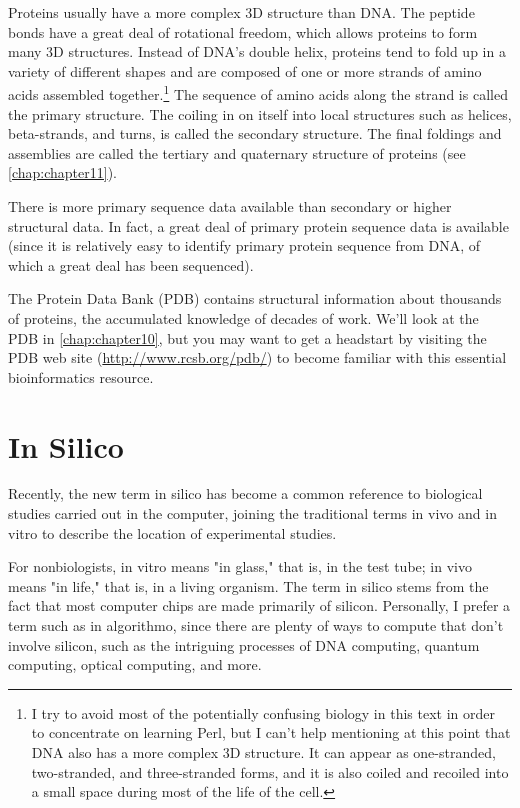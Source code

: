 Proteins usually have a more complex 3D structure than DNA. The peptide bonds have a great deal of rotational freedom, which allows proteins to form many 3D structures. Instead of DNA's double helix, proteins tend to fold up in a variety of different shapes and are composed of one or more strands of amino acids assembled together.\footnote{I try to avoid most of the potentially confusing biology in this text in order to concentrate on learning Perl, but I can't help mentioning at this point that DNA also has a more complex 3D structure. It can appear as one-stranded, two-stranded, and three-stranded forms, and it is also coiled and recoiled into a small space during most of the life of the cell.} The sequence of amino acids along the strand is called the primary structure. The coiling in on itself into local structures such as helices, beta-strands, and turns, is called the secondary structure.  The final foldings and assemblies are called the tertiary and quaternary structure of proteins (see \autoref{chap:chapter11}).

There is more primary sequence data available than secondary or higher structural data. In fact, a great deal of primary protein sequence data is available (since it is relatively easy to identify primary protein sequence from DNA, of which a great deal has been sequenced).

The Protein Data Bank (PDB) contains structural information about thousands of proteins, the accumulated knowledge of decades of work.  We'll look at the PDB in \autoref{chap:chapter10}, but you may want to get a headstart by visiting the PDB web site (\href{http://www.rcsb.org/pdb/}{http://www.rcsb.org/pdb/}) to become familiar with this essential bioinformatics resource. 

\section{In Silico}
Recently, the new term in silico has become a common reference to biological studies carried out in the computer, joining the traditional terms in vivo and in vitro to describe the location of experimental studies.

For nonbiologists, in vitro means "in glass," that is, in the test tube; in vivo means "in life," that is, in a living organism. The term in silico stems from the fact that most computer chips are made primarily of silicon. Personally, I prefer a term such as in algorithmo, since there are plenty of ways to compute that don't involve silicon, such as the intriguing processes of DNA computing, quantum computing, optical computing, and more.

